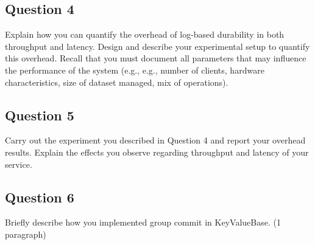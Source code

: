 \documentclass[12pt,a4paper]{article}
\begin{document}
\subsection*{Question 4}
\label{sec:pq4}
Explain how you can quantify the overhead of log-based durability in both throughput and
latency. Design and describe your experimental setup to quantify this overhead. Recall that you must
document all parameters that may influence the performance of the system (e.g., e.g., number of clients,
hardware characteristics, size of dataset managed, mix of operations).


\subsection*{Question 5}
\label{sec:pq5}
Carry out the experiment you described in Question 4 and report your overhead results.
Explain the effects you observe regarding throughput and latency of your service.


\subsection*{Question 6}
\label{sec:pq6}

Briefly describe how you implemented group commit in KeyValueBase. (1 paragraph)



 
\begin{thebibliography}{1}


\end{thebibliography}
\end{document}
